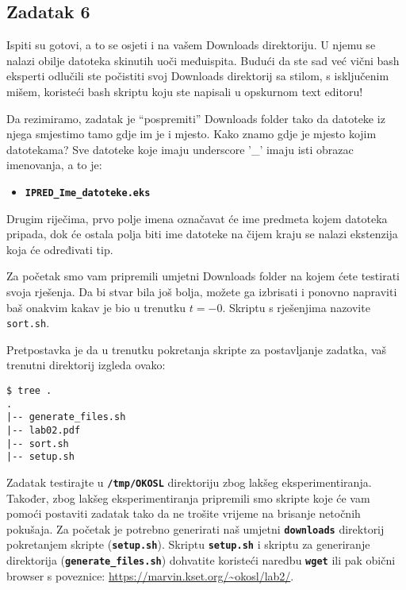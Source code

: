 \documentclass[12pt,a4paper]{article}
\newcommand{\shell}[1]{\texttt{\textbf{#1}}}
\begin{document}
    \subsection*{Zadatak 6}
    Ispiti su gotovi, a to se osjeti i na vašem Downloads direktoriju. U njemu
    se nalazi obilje datoteka skinutih uoči međuispita. Budući da ste sad već
    vični bash eksperti odlučili ste počistiti svoj Downloads direktorij sa
    stilom, s isključenim mišem, koristeći bash skriptu koju ste napisali u
    opskurnom text editoru!

    Da rezimiramo, zadatak je ``pospremiti'' Downloads folder tako da datoteke iz
    njega smjestimo tamo gdje im je i mjesto. Kako znamo gdje je mjesto kojim
    datotekama? Sve datoteke koje imaju underscore '\_' imaju isti obrazac
    imenovanja, a to je:

    \begin{itemize}
        \item[] \shell{IPRED\_Ime\_datoteke.eks}
    \end{itemize}

    Drugim riječima, prvo polje imena označavat će ime predmeta kojem datoteka
    pripada, dok će ostala polja biti ime datoteke na čijem kraju se nalazi
    ekstenzija koja će određivati tip.

    Za početak smo vam pripremili umjetni Downloads folder na kojem ćete
    testirati svoja rješenja. Da bi stvar bila još bolja, možete ga izbrisati
    i ponovno napraviti baš onakvim kakav je bio u trenutku $t = -0$. Skriptu
    s rješenjima nazovite \texttt{sort.sh}.

    Pretpostavka je da u trenutku pokretanja skripte za postavljanje zadatka,
    vaš trenutni direktorij izgleda ovako:

    \begin{verbatim}
$ tree .
.
|-- generate_files.sh
|-- lab02.pdf
|-- sort.sh
|-- setup.sh
    \end{verbatim}

    Zadatak testirajte u \shell{/tmp/OKOSL} direktoriju zbog lakšeg eksperimentiranja.
    Također, zbog lakšeg eksperimentiranja pripremili smo skripte koje će vam pomoći
    postaviti zadatak tako da ne trošite vrijeme na brisanje netočnih pokušaja.
    Za početak je potrebno generirati naš umjetni \shell{downloads} direktorij pokretanjem
    skripte (\shell{setup.sh}). Skriptu \shell{setup.sh} i skriptu za generiranje direktorija
    (\shell{generate\_files.sh}) dohvatite koristeći naredbu \shell{wget} ili pak obični browser s poveznice: \url{https://marvin.kset.org/~okosl/lab2/}.
\end{document}
